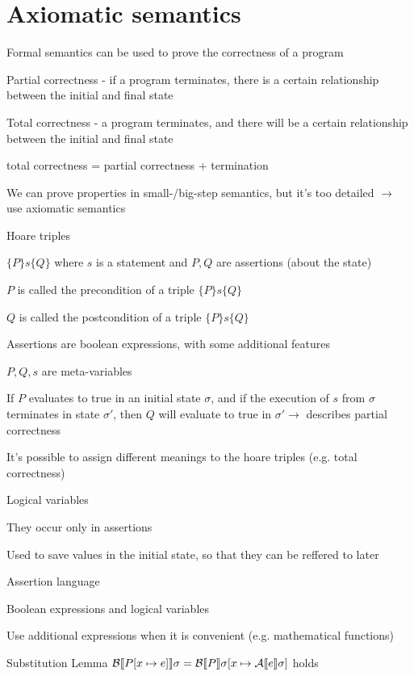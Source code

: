 \section{Axiomatic semantics}
\enumstart
	\item Formal semantics can be used to prove the correctness of a program
	\enumstart
		\item Partial correctness - if a program terminates, there is a certain relationship between the initial and final state
		\item Total correctness - a program terminates, and there will be a certain relationship between the initial and final state
		\item total correctness = partial correctness + termination
	\enumend
	\item We can prove properties in small-/big-step semantics, but it's too detailed $\rightarrow$ use axiomatic semantics
	\item Hoare triples
	\enumstart
		\item $\{P\}s\{Q\}$ where $s$ is a statement and $P, Q$ are assertions (about the state)
		\item $P$ is called the precondition of a triple $\{P\}s\{Q\}$
		\item $Q$ is called the postcondition of a triple $\{P\}s\{Q\}$
		\item Assertions are boolean expressions, with some additional features
		\item $P,Q,s$ are meta-variables
		\item If $P$ evaluates to true in an initial state $\sigma$, and if the execution of $s$ from $\sigma$ terminates in state $\sigma'$, then $Q$ will evaluate to true in $\sigma' \rightarrow$ describes partial correctness
		\item It's possible to assign different meanings to the hoare triples (e.g. total correctness)
	\enumend
	\item Logical variables
	\enumstart
		\item They occur only in assertions
		\item Used to save values in the initial state, so that they can be reffered to later
	\enumend
	\item Assertion language
	\enumstart
		\item Boolean expressions and logical variables
		\item Use additional expressions when it is convenient (e.g. mathematical functions)
		\item Substitution Lemma $\mathcal{B}\llbracket P[x \mapsto e] \rrbracket \sigma = \mathcal{B}\llbracket P \rrbracket \sigma[x \mapsto \mathcal{A} \llbracket e \rrbracket \sigma]$ holds
